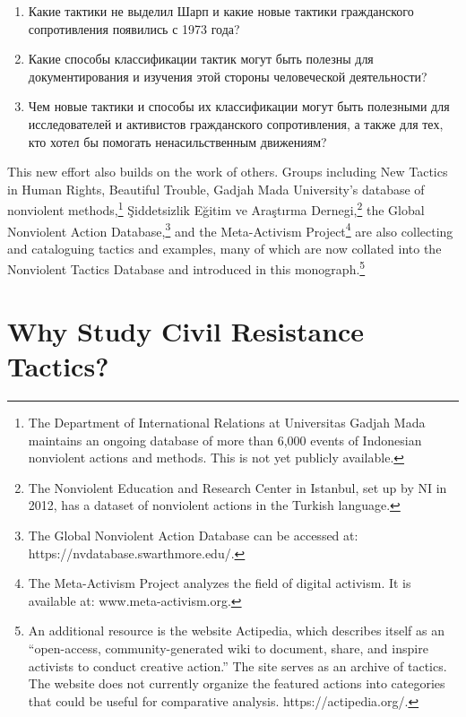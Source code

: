 \documentclass[twoside,a4paper,12pt,fleqn,openany]{extbook}
\newcommand{\ml}[2]{#2}
\begin{document}
\begin{enumerate}
\item
\ml
{What tactics did Sharp not identify and what new tactics of civil resistance have emerged since 1973?}
{Какие тактики не выделил Шарп и какие новые тактики гражданского сопротивления появились с 1973 года?}
\item
\ml
{What new categorization of tactics can be helpful in documenting and understanding this common human activity?}
{Какие способы классификации тактик могут быть полезны для документирования и изучения этой стороны человеческой деятельности?}
\item
\ml
{How can this new knowledge—on tactics and classification—be helpful to practitioners and scholars of civil resistance, as well as those who would like to assist nonviolent movements?}
{Чем новые тактики и способы их классификации могут быть полезными для исследователей и активистов гражданского сопротивления, а также для тех, кто хотел бы помогать ненасильственным движениям?}
\end{enumerate}

This new effort also builds on the work of others. Groups including New Tactics in Human Rights, Beautiful Trouble, Gadjah Mada University’s database of nonviolent methods,\footnote{The Department of International Relations at Universitas Gadjah Mada maintains an ongoing database of more than 6,000 events of Indonesian nonviolent actions and methods. This is not yet publicly available.} Şiddetsizlik Eğitim ve Araştırma Dernegi,\footnote{The Nonviolent Education and Research Center in Istanbul, set up by NI in 2012, has a dataset of nonviolent actions in the Turkish language.} the Global Nonviolent Action Database,\footnote{The Global Nonviolent Action Database can be accessed at: https://nvdatabase.swarthmore.edu/.} and the Meta-Activism Project\footnote{The Meta-Activism Project analyzes the field of digital activism. It is available at: www.meta-activism.org.} are also collecting and cataloguing tactics and examples, many of which are now collated into the Nonviolent Tactics Database and introduced in this monograph.\footnote{An additional resource is the website Actipedia, which describes itself as an “open-access, community-generated wiki to document, share, and inspire activists to conduct creative action.” The site serves as an archive of tactics. The website does not currently organize the featured actions into categories that could be useful for comparative analysis. https://actipedia.org/.}

\section*{Why Study Civil Resistance Tactics?}
\end{document}

